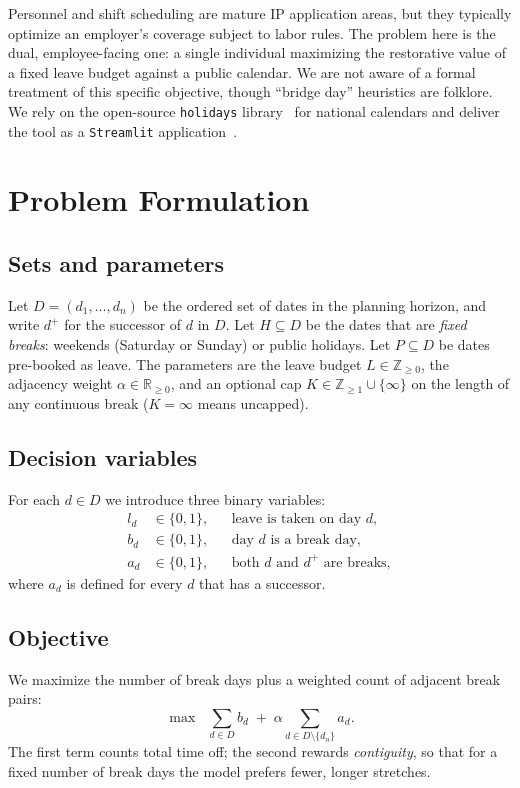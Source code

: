 \documentclass[10pt,twocolumn]{article}
\begin{document}
Personnel and shift scheduling are mature IP application areas, but they
typically optimize an employer's coverage subject to labor rules. The problem
here is the dual, employee-facing one: a single individual maximizing the
restorative value of a fixed leave budget against a public calendar. We are not
aware of a formal treatment of this specific objective, though ``bridge day''
heuristics are folklore. We rely on the open-source \texttt{holidays}
library~\cite{pythonholidays} for national calendars and deliver the tool as a
\texttt{Streamlit} application~\cite{streamlit}.

\section{Problem Formulation}
\label{sec:model}

\subsection{Sets and parameters}
Let $D = (d_1, \dots, d_n)$ be the ordered set of dates in the planning
horizon, and write $d^{+}$ for the successor of $d$ in $D$. Let
$H \subseteq D$ be the dates that are \emph{fixed breaks}: weekends (Saturday or
Sunday) or public holidays. Let $P \subseteq D$ be dates pre-booked as leave.
The parameters are the leave budget $L \in \mathbb{Z}_{\ge 0}$, the adjacency
weight $\alpha \in \mathbb{R}_{\ge 0}$, and an optional cap
$K \in \mathbb{Z}_{\ge 1} \cup \{\infty\}$ on the length of any continuous break
($K=\infty$ means uncapped).

\subsection{Decision variables}
For each $d \in D$ we introduce three binary variables:
\begin{align}
  l_d &\in \{0,1\}, && \text{leave is taken on day } d,\\
  b_d &\in \{0,1\}, && \text{day } d \text{ is a break day},\\
  a_d &\in \{0,1\}, && \text{both } d \text{ and } d^{+} \text{ are breaks},
\end{align}
where $a_d$ is defined for every $d$ that has a successor.

\subsection{Objective}
We maximize the number of break days plus a weighted count of adjacent break
pairs:
\begin{equation}
  \max \;\; \sum_{d \in D} b_d \;+\; \alpha \sum_{d \in D \setminus \{d_n\}} a_d .
  \label{eq:obj}
\end{equation}
The first term counts total time off; the second rewards \emph{contiguity}, so
that for a fixed number of break days the model prefers fewer, longer stretches.
\end{document}

